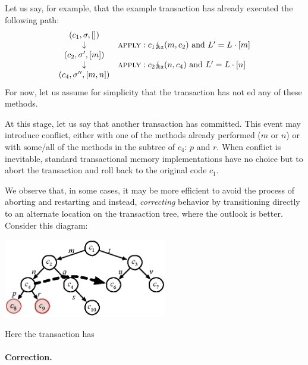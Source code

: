 Let us say, for example, that the example transaction has already
executed the following path:
\[\begin{array}{cl}
 (c_1,\sigma,[])\\
  \downarrow & \text{{\sc apply}}: c_1 \lightning_{\mkern-7mu \texttt{tx}} (m,c_2) \text{ and } L'=L\cdot[m]\\
 (c_2,\sigma',[m])\\
  \downarrow & \text{{\sc apply}}: c_2 \lightning_{\mkern-7mu \texttt{tx}} (n,c_4) \text{ and } L'=L\cdot[n]\\
 (c_4,\sigma'',[m,n])\\
\end{array}\]
For now, let us assume for simplicity that the transaction has not
\PUSH{}ed any of these methods.

At this stage, let us say that another transaction has committed. This
event may introduce conflict, either with one of the methods already
performed ($m$ or $n$) or with some/all of the methods in the subtree
of $c_4$: $p$ and $r$. When conflict is inevitable, standard
transactional memory implementations have no choice but to abort the
transaction and roll back to the original code $c_1$.

We observe that, in some cases, it may be more efficient to avoid the
process of aborting and restarting and instead, \emph{correcting}
behavior by transitioning directly to an alternate location on the
transaction tree, where the outlook is better. Consider this diagram:
\begin{center}
\includegraphics[width=2.8in]{stages1.eps}
\end{center}
Here the transaction has 

\paragraph{Correction.}


